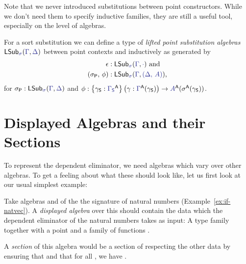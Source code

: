 Note that we never introduced substitutions between point constructors.
While we don't need them to specify inductive families, they are still
a useful tool, especially on the level of algebras.

\begin{defn}\label{def:if-alg-lsub}
For a sort substitution \tqm{\IFSub{\sigma}{\Gamma_\Sc}{\Delta_\Sc}} we can
define a type of \emph{lifted point substitution algebras} $\LSub{\sigma}{\Gamma}{\Delta}$ between
point contexts \tqm{\vdash_{\Gamma_\Sc} \Gamma} and
\tqm{\vdash_{\Delta_\Sc} \Delta} inductively as generated by
\begin{align*}
\epsilon		&: \LSub{\sigma}{\Gamma}{\cdot} \text{ and} \\
(\sigma_\Pc,\, \phi)	&: \LSub{\sigma}{\Gamma}{(\Delta,\, A)} \text{,}
\end{align*}
for $\sigma_\Pc : \LSub{\sigma}{\Gamma}{\Delta}$ and
$\phi : \left\{\gamma_\Sc : \tqm{\Gamma_\Sc}^\CC\right\} \left(\gamma : \tqm{\Gamma}^\CC(\gamma_\Sc)\right) \to \tqm{A}^\CC(\sigma^\CC(\gamma_\Sc))$.
\end{defn}


\section{Displayed Algebras and their Sections}\label{sec:if-ds}

To represent the dependent eliminator, we need algebras which vary over other
algebras.
To get a feeling about what these should look like, let us first look at our
usual simplest example:

\begin{example}\label{ex:if-ds-nat}
Take algebras  and
 of
the the signature of natural numbers (Example~\ref{ex:if-natvec}).
A \emph{displayed algebra} over this should contain the data which the dependent
eliminator of the natural numbers takes as input:
A type family  together with a point 
and a family of functions .

A \emph{section} of this algebra would be a section  of
 respecting the other data by ensuring that 
and that for all , we have .
\end{example}

